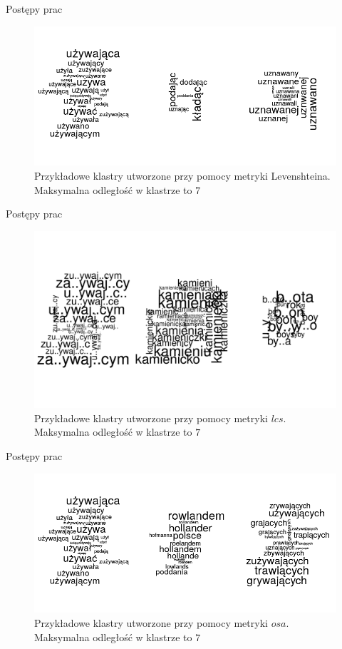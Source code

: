 \documentclass[11pt,pdftex,mathserif]{beamer}\usepackage[]{graphicx}\usepackage[]{color}
\theoremstyle{definition}
\begin{document}
\begin{frame}{Postępy prac}
\begin{figure}[h]
      \centering
      \includegraphics[width=12cm] {lv}
      \caption{Przykładowe klastry utworzone przy pomocy metryki Levenshteina. Maksymalna odległość w klastrze to $7$}
    \end{figure}

\end{frame}



\begin{frame}{Postępy prac}
\begin{figure}[h]
      \centering
      \includegraphics[width=12cm] {lcs}
      \caption{Przykładowe klastry utworzone przy pomocy metryki $lcs$. Maksymalna odległość w klastrze to $7$}
    \end{figure}

\end{frame}



\begin{frame}{Postępy prac}
\begin{figure}[h]
      \centering
      \includegraphics[width=12cm] {osa}
      \caption{Przykładowe klastry utworzone przy pomocy metryki $osa$. Maksymalna odległość w klastrze to $7$}
    \end{figure}

\end{frame}
\end{document}
